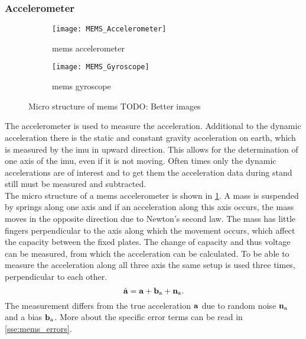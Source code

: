 \subsubsection{ Accelerometer}
\begin{figure}[htb]
	\centering
	\begin{subfigure}{0.48\textwidth}
		\centering
		\texttt{[image: MEMS\_Accelerometer]}
		\caption{\acrshort{mems} accelerometer}
		\label{fig:MEMS_Accelerometer}
	\end{subfigure}
	\begin{subfigure}{0.48\textwidth}
		\centering
		\texttt{[image: MEMS\_Gyroscope]}
		\caption{\acrshort{mems} gyroscope}
		\label{fig:MEMS_Gyroscope}
	\end{subfigure}
	\caption{Micro structure of \acrshort{mems} TODO: Better images}
	\label{fig:MEMS_design}
\end{figure}
The accelerometer is used to measure the acceleration.
Additional to the dynamic acceleration there is the static and constant gravity acceleration on earth, which is measured by the \gls{imu} in upward direction.
This allows for the determination of one axis of the \gls{imu}, even if it is not moving.
Often times only the dynamic accelerations are of interest and to get them the acceleration data during stand still must be measured and subtracted.\\
The micro structure of a \gls{mems} accelerometer is shown in \cref{fig:MEMS_Accelerometer}.
A mass is suspended by springs along one axis and if an acceleration along this axis occurs, the mass moves in the opposite direction due to Newton's second law.
The mass has little fingers perpendicular to the axis along which the movement occurs, which affect the capacity between the fixed plates.
The change of capacity and thus voltage can be measured, from which the acceleration can be calculated.
To be able to measure the acceleration along all three axis the same setup is used three times, perpendicular to each other.\\
\begin{equation}
	\hat{\vb{a}} = \vb{a} + \vb{b}_\mathrm{a} + \vb{n}_\mathrm{a}.
\end{equation}
The measurement differs from the true acceleration $\vb{a}$ due to random noise $\vb{n}_\mathrm{a}$ and a bias $\vb{b}_\mathrm{a}$.
More about the specific error terms can be read in \cref{sse:mems_errors}.

